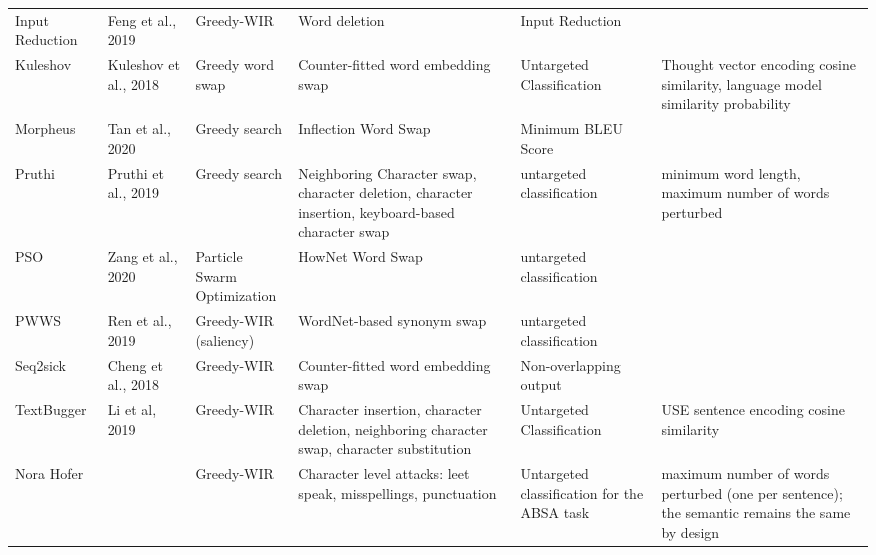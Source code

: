 \begin{table}
\begin{tabular}{llllll}
Input Reduction &Feng et al., 2019 &Greedy-WIR &Word deletion &Input Reduction & \\

Kuleshov &Kuleshov et al., 2018 &Greedy word swap &Counter-fitted word embedding swap &Untargeted Classification &Thought vector encoding cosine similarity, language model similarity probability \\

Morpheus &Tan et al., 2020 &Greedy search &Inflection Word Swap &Minimum BLEU Score & \\

Pruthi &Pruthi et al., 2019 &Greedy search &Neighboring Character swap, character deletion, character insertion, keyboard-based character swap &untargeted classification &minimum word length, maximum number of words perturbed \\

PSO &Zang et al., 2020 &\makecell[l]{Particle Swarm\\ Optimization}&HowNet Word Swap &untargeted classification & \\

PWWS &Ren et al., 2019 &\makecell[l]{Greedy-WIR\\ (saliency)} &WordNet-based synonym swap &untargeted classification & \\

Seq2sick &Cheng et al., 2018 &Greedy-WIR &Counter-fitted word embedding swap &Non-overlapping output & \\

TextBugger &Li et al, 2019 &Greedy-WIR &Character insertion, character deletion, neighboring character swap, character substitution &Untargeted Classification &USE sentence encoding cosine similarity \\

Nora Hofer & &Greedy-WIR &Character level attacks: leet speak, misspellings, punctuation &Untargeted classification for the ABSA task &maximum number of words perturbed (one per sentence); the semantic remains the same by design \\
\bottomrule
\end{tabular}
\end{table}


